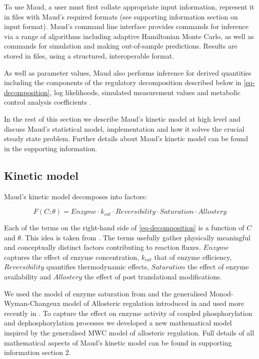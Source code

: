 \documentclass[journal=asbcd6,manuscript=article,layout=traditional]{achemso}
\begin{document}
To use Maud, a user must first collate appropriate input information,
represent it in files with Maud's required formats (see supporting
information section on input format). Maud's command line interface
provides commands for inference via a range of algorithms including
adaptive Hamiltonian Monte Carlo, as well as commands for simulation and
making out-of-sample predictions. Results are stored in files, using a
structured, interoperable format.

As well as parameter values, Maud also performs inference for derived
quantities including the components of the regulatory decomposition
described below in \eqref{eq-decomposition}, log likelihoods, simulated
measurement values and metabolic control analysis coefficients
\citep{kacser_control_1973}.

In the rest of this section we describe Maud's kinetic model at high
level and discuss Maud's statistical model, implementation and how it
solves the crucial steady state problem. Further details about Maud's
kinetic model can be found in the supporting information.

\subsection{Kinetic model}\label{kinetic-model}

Maud's kinetic model decomposes into factors:

\begin{equation}
F(C;\theta) = Enzyme\cdot k_{cat}\cdot Reversibility \cdot Saturation \cdot Allostery \label{eq-decomposition}
\end{equation}

Each of the terms on the right-hand side of \eqref{eq-decomposition} is
a function of \(C\) and \(\theta\). This idea is taken from
\citet{noor_note_2013}. The terms usefully gather physically meaningful
and conceptually distinct factors contributing to reaction fluxes.
\(Enzyme\) captures the effect of enzyme concentration, \(k_{cat}\) that
of enzyme efficiency, \(Reversibility\) quantifies thermodynamic
effects, \(Saturation\) the effect of enzyme availability and
\(Allostery\) the effect of post translational modifications.

We used the model of enzyme saturation from
\citet{liebermeister_modular_2010} and the generalised
Monod-Wyman-Changeux model of Allosteric regulation introduced in
\citep{monod_nature_1965, changeux_2013, popova_generalization_1975, popova_description_1979}
and used more recently in \citet{matosGRASPComputationalPlatform2022}.
To capture the effect on enzyme activity of coupled phosphorylation and
dephosphorylation processes we developed a new mathematical model
inspired by the generalised MWC model of allosteric regulation. Full
details of all mathematical aspects of Maud's kinetic model can be found
in supporting information section 2.
\end{document}
